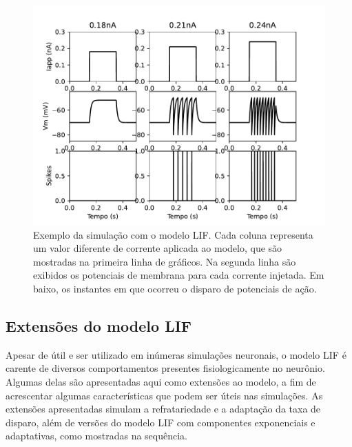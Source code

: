 \begin{figure}[htb!]
	\centering
	\caption[Exemplo da simulação com o modelo LIF]{Exemplo da simulação com o modelo LIF. Cada coluna representa um valor diferente de corrente aplicada ao modelo, que são mostradas na primeira linha de gráficos. Na segunda linha são exibidos os potenciais de membrana para cada corrente injetada. Em baixo, os instantes em que ocorreu o disparo de potenciais de ação.}
	\label{fig:lif}
	\includegraphics[width=0.7\linewidth]{figs/lif}
\end{figure}


\subsection{Extensões do modelo LIF}
Apesar de útil e ser utilizado em inúmeras simulações neuronais, o modelo LIF é carente de diversos comportamentos presentes fisiologicamente no neurônio. Algumas delas são apresentadas aqui como extensões ao modelo, a fim de acrescentar algumas características que podem ser úteis nas simulações. As extensões apresentadas simulam a refratariedade e a adaptação da taxa de disparo, além de versões do modelo LIF com componentes exponenciais e adaptativas, como mostradas na sequência.
